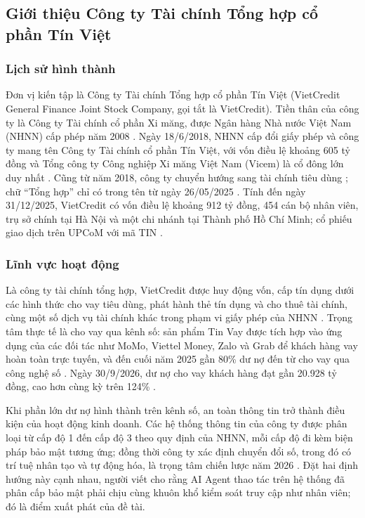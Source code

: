 
\subsection{Giới thiệu Công ty Tài chính Tổng hợp cổ phần Tín Việt}

\subsubsection{Lịch sử hình thành}

Đơn vị kiến tập là Công ty Tài chính Tổng hợp cổ phần Tín Việt (VietCredit General Finance Joint Stock Company, gọi tắt là VietCredit). Tiền thân của công ty là Công ty Tài chính cổ phần Xi măng, được Ngân hàng Nhà nước Việt Nam (NHNN) cấp phép năm 2008 \parencite{vietcredit_bctn2025}. Ngày 18/6/2018, NHNN cấp đổi giấy phép và công ty mang tên Công ty Tài chính cổ phần Tín Việt, với vốn điều lệ khoảng 605 tỷ đồng và Tổng công ty Công nghiệp Xi măng Việt Nam (Vicem) là cổ đông lớn duy nhất \parencite{nhadautu_doiten2018}. Cũng từ năm 2018, công ty chuyển hướng sang tài chính tiêu dùng \parencite{vietcredit_bctn2025}; chữ ``Tổng hợp'' chỉ có trong tên từ ngày 26/05/2025 \parencite{baodautu_doiten2025}. Tính đến ngày 31/12/2025, VietCredit có vốn điều lệ khoảng 912 tỷ đồng, 454 cán bộ nhân viên, trụ sở chính tại Hà Nội và một chi nhánh tại Thành phố Hồ Chí Minh; cổ phiếu giao dịch trên UPCoM với mã TIN \parencite{vietcredit_bctn2025}.

\subsubsection{Lĩnh vực hoạt động}

Là công ty tài chính tổng hợp, VietCredit được huy động vốn, cấp tín dụng dưới các hình thức cho vay tiêu dùng, phát hành thẻ tín dụng và cho thuê tài chính, cùng một số dịch vụ tài chính khác trong phạm vi giấy phép của NHNN \parencite{vietcredit_bctn2025}. Trọng tâm thực tế là cho vay qua kênh số: sản phẩm Tin Vay được tích hợp vào ứng dụng của các đối tác như MoMo, Viettel Money, Zalo và Grab để khách hàng vay hoàn toàn trực tuyến, và đến cuối năm 2025 gần 80\% dư nợ đến từ cho vay qua công nghệ số \parencite{vietcredit_kqkd2025}. Ngày 30/9/2026, dư nợ cho vay khách hàng đạt gần 20.928 tỷ đồng, cao hơn cùng kỳ trên 124\% \parencite{vnba_9t2026}.

Khi phần lớn dư nợ hình thành trên kênh số, an toàn thông tin trở thành điều kiện của hoạt động kinh doanh. Các hệ thống thông tin của công ty được phân loại từ cấp độ 1 đến cấp độ 3 theo quy định của NHNN, mỗi cấp độ đi kèm biện pháp bảo mật tương ứng; đồng thời công ty xác định chuyển đổi số, trong đó có trí tuệ nhân tạo và tự động hóa, là trọng tâm chiến lược năm 2026 \parencite{vietcredit_bctn2025}. Đặt hai định hướng này cạnh nhau, người viết cho rằng AI Agent thao tác trên hệ thống đã phân cấp bảo mật phải chịu cùng khuôn khổ kiểm soát truy cập như nhân viên; đó là điểm xuất phát của đề tài.

